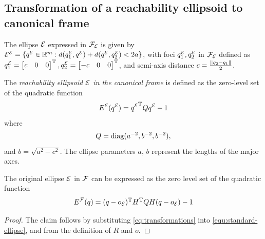 \documentclass[10pt,twocolumn,twoside]{IEEEtran}
\begin{document}
\appendix
\subsection{Transformation of a reachability ellipsoid to canonical frame}\label{apx:transformation}
The ellipse $\mathcal{E}$ expressed in $\mathcal{F}_{\mathcal{E}}$ is given by ${\mathcal{E}^{\mathcal{E}}}=\{{q^{\mathcal{E}}}\in\mathbb{R}^{m}{}:d(q^{\mathcal{E}}_1,{q^{\mathcal{E}}})+d({q^{\mathcal{E}}},q^{\mathcal{E}}_2)<2a\}$, with foci $q^{\mathcal{E}}_1,q^{\mathcal{E}}_2$ in $\mathcal{F}_{\mathcal{E}}$ defined as
$q^{\mathcal{E}}_1=\begin{bmatrix}c & 0 & 0\end{bmatrix}^\mathrm{T}, q^{\mathcal{E}}_2=\begin{bmatrix}-c & 0 & 0\end{bmatrix}^\mathrm{T}$, and semi-axis distance $c=\frac{\lVert q_2-q_1\rVert}{2}$.
\begin{definition}
  The \emph{reachability ellipsoid $\mathcal{E}$ in the canonical frame} is defined as the zero-level set of the quadratic function
  \begin{equation}\label{equ:standard-ellipse}
    {E^{\mathcal{E}}}({q^{\mathcal{E}}}) = {q^{\mathcal{E}}}^\mathrm{T} Q {q^{\mathcal{E}}} - 1
  \end{equation}
  where
  \begin{equation}
    Q = \operatorname{diag}(a^{-2},b^{-2},b^{-2}),
  \end{equation}
  and $b = \sqrt{a^2-c^2}$.
  The ellipse parameters $a$, $b$ represent the lengths of the major axes.
\end{definition}
\begin{lemma}
The original ellipse $\mathcal{E}$ in $\mathcal{F}$ can be expressed as the zero level set of the quadratic function
   \begin{equation}\label{eq:ellpsoid from canonical}
     {E^{\mathcal{F}}}(q) = (q-o_{\mathcal{E}})^\mathrm{T} H^\mathrm{T} Q H (q-o_{\mathcal{E}}) - 1
     \end{equation}
\end{lemma}
\begin{proof}
    The claim follows by substituting  \eqref{eq:transformations} into \eqref{equ:standard-ellipse}, and from the definition of $R$ and $o$.
\end{proof}
\end{document}
